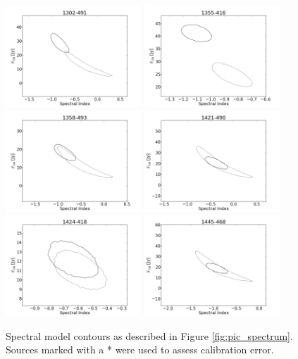 \documentclass[preprint]{aastex}
\begin{document}
\begin{figure}[htbp]
\begin{center}
\includegraphics[width=2in]{plots/1302-491_SI_MCMC.png} %
\includegraphics[width=2in]{plots/1355-416_SI_MCMC.png} %
\includegraphics[width=2in]{plots/1358-493_SI_MCMC.png} %
\includegraphics[width=2in]{plots/1421-490_SI_MCMC.png} %
\includegraphics[width=2in]{plots/1424-418_SI_MCMC.png} %
\includegraphics[width=2in]{plots/1445-468_SI_MCMC.png} %
\end{center}
\caption{Spectral model contours as described in Figure \ref{fig:pic_spectrum}. Sources marked with a
* were used to assess calibration error.
}\label{fig:SI_contour_3}
\end{figure}
\end{document}
